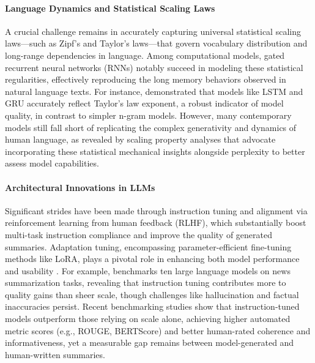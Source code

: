 \documentclass[sigconf]{acmart}
\begin{document}
\paragraph{Language Dynamics and Statistical Scaling Laws}  
A crucial challenge remains in accurately capturing universal statistical scaling laws—such as Zipf’s and Taylor’s laws—that govern vocabulary distribution and long-range dependencies in language. Among computational models, gated recurrent neural networks (RNNs) notably succeed in modeling these statistical regularities, effectively reproducing the long memory behaviors observed in natural language texts. For instance, \cite{ref51} demonstrated that models like LSTM and GRU accurately reflect Taylor’s law exponent, a robust indicator of model quality, in contrast to simpler n-gram models. However, many contemporary models still fall short of replicating the complex generativity and dynamics of human language, as revealed by scaling property analyses that advocate incorporating these statistical mechanical insights alongside perplexity to better assess model capabilities.

\paragraph{Architectural Innovations in LLMs}  
Significant strides have been made through instruction tuning and alignment via reinforcement learning from human feedback (RLHF), which substantially boost multi-task instruction compliance and improve the quality of generated summaries. Adaptation tuning, encompassing parameter-efficient fine-tuning methods like LoRA, plays a pivotal role in enhancing both model performance and usability \cite{ref10,ref52}. For example, \cite{ref1} benchmarks ten large language models on news summarization tasks, revealing that instruction tuning contributes more to quality gains than sheer scale, though challenges like hallucination and factual inaccuracies persist. Recent benchmarking studies show that instruction-tuned models outperform those relying on scale alone, achieving higher automated metric scores (e.g., ROUGE, BERTScore) and better human-rated coherence and informativeness, yet a measurable gap remains between model-generated and human-written summaries.
\end{document}
